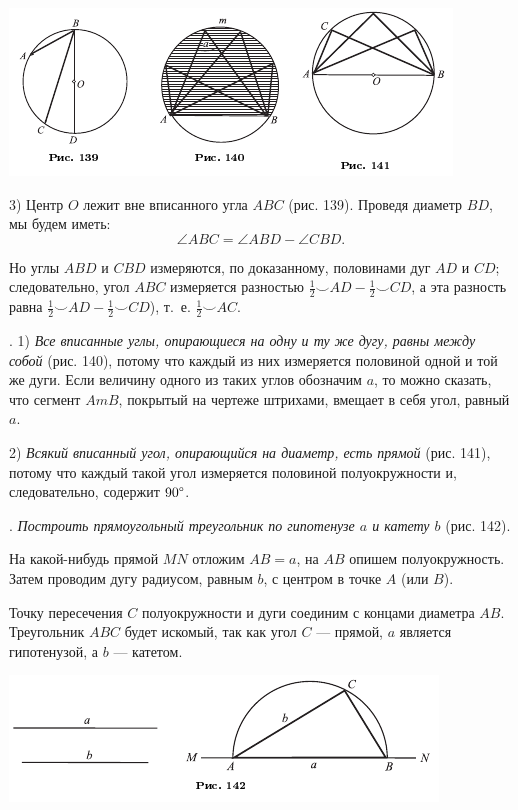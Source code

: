 \documentclass[oneside]{book}
\begin{document}
\includegraphics{pics/ris-139-141}

3) Центр $O$ лежит вне вписанного угла $ABC$ (рис. 139).
Проведя диаметр $BD$, мы будем иметь:
\[\angle ABC=\angle ABD-\angle CBD.\]

Но углы $ABD$ и $CBD$ измеряются, по доказанному, половинами дуг $AD$ и $CD$;
следовательно, угол $ABC$ измеряется разностью
$\tfrac12{\smallsmile}AD-\tfrac12{\smallsmile}CD$, а эта разность равна $\tfrac12{\smallsmile}AD-\tfrac12{\smallsmile}CD$), т.~е.
$\tfrac12{\smallsmile}AC$.

.
1) \emph{Все вписанные углы, опирающиеся на одну и ту же дугу, равны между собой} (рис. 140), потому что каждый из них измеряется половиной одной и той же дуги.
Если величину одного из таких углов обозначим $a$, то можно сказать, что сегмент $AmB$, покрытый на чертеже штрихами, вмещает в себя угол, равный $a$.

2) \emph{Всякий вписанный угол, опирающийся на диаметр, есть прямой} (рис. 141), потому что каждый такой угол измеряется половиной полуокружности и, следовательно, содержит $90\degree$.

.
\emph{Построить прямоугольный треугольник по гипотенузе $a$ и катету $b$} (рис. 142).

На какой-нибудь прямой $MN$ отложим $AB=a$, на $AB$ опишем полуокружность.
Затем проводим дугу радиусом, равным $b$, с центром в точке $A$ (или $B$).

Точку пересечения $C$ полуокружности и дуги соединим с концами диаметра $AB$.
Треугольник $ABC$ будет искомый, так как угол $C$ — прямой, $a$ является гипотенузой, а $b$ — катетом.

\includegraphics{pics/ris-142}
\end{document}
